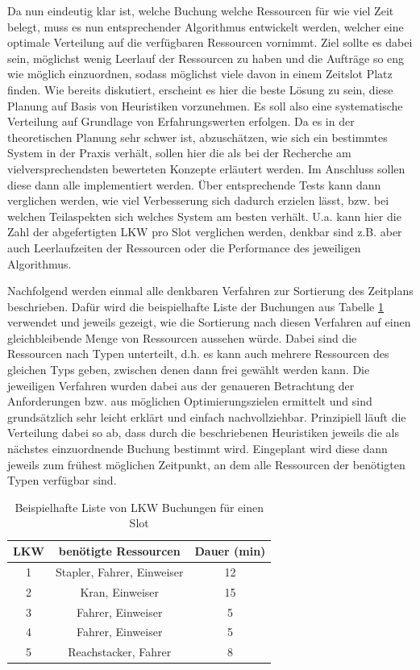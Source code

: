 Da nun eindeutig klar ist, welche Buchung welche Ressourcen für wie viel Zeit belegt, muss es nun entsprechender Algorithmus entwickelt werden, welcher eine optimale Verteilung auf die verfügbaren Ressourcen vornimmt. Ziel sollte es dabei sein, möglichst wenig Leerlauf der Ressourcen zu haben und die Aufträge so eng wie möglich einzuordnen, sodass möglichst viele davon in einem Zeitslot Platz finden. Wie bereits diskutiert, erscheint es hier die beste Lösung zu sein, diese Planung auf Basis von Heuristiken vorzunehmen. Es soll also eine systematische Verteilung auf Grundlage von Erfahrungswerten erfolgen. Da es in der theoretischen Planung sehr schwer ist, abzuschätzen, wie sich ein bestimmtes System in der Praxis verhält, sollen hier die als bei der Recherche am vielversprechendsten bewerteten Konzepte erläutert werden. Im Anschluss sollen diese dann alle implementiert werden. Über entsprechende Tests kann dann verglichen werden, wie viel Verbesserung sich dadurch erzielen lässt, bzw. bei welchen Teilaspekten sich welches System am besten verhält. U.a. kann hier die Zahl der abgefertigten LKW pro Slot verglichen werden, denkbar sind z.B. aber auch Leerlaufzeiten der Ressourcen oder die Performance des jeweiligen Algorithmus.

Nachfolgend werden einmal alle denkbaren Verfahren zur Sortierung des Zeitplans beschrieben. Dafür wird die beispielhafte Liste der Buchungen aus Tabelle \ref{tab:exampleAdvices} verwendet und jeweils gezeigt, wie die Sortierung nach diesen Verfahren auf einen gleichbleibende Menge von Ressourcen aussehen würde. Dabei sind die Ressourcen nach Typen unterteilt, d.h. es kann auch mehrere Ressourcen des gleichen Typs geben, zwischen denen dann frei gewählt werden kann. Die jeweiligen Verfahren wurden dabei aus der genaueren Betrachtung der Anforderungen bzw. aus möglichen Optimierungszielen ermittelt und sind grundsätzlich sehr leicht erklärt und einfach nachvollziehbar. Prinzipiell läuft die Verteilung dabei so ab, dass durch die beschriebenen Heuristiken jeweils die als nächstes einzuordnende Buchung bestimmt wird. Eingeplant wird diese dann jeweils zum frühest möglichen Zeitpunkt, an dem alle Ressourcen der benötigten Typen verfügbar sind.

\begin{table}[!h]
\begin{center}
\caption{Beispielhafte Liste von LKW Buchungen für einen Slot}
\label{tab:exampleAdvices}
\begin{tabular}{c|c|c} 
    LKW & benötigte Ressourcen & Dauer (min) \\\hline
    1 & Stapler, Fahrer, Einweiser & 12 \\\hline
    2 & Kran, Einweiser & 15 \\\hline
    3 & Fahrer, Einweiser & 5 \\\hline
    4 & Fahrer, Einweiser & 5 \\\hline
    5 & Reachstacker, Fahrer & 8 \\
\end{tabular}
\end{center}
\end{table}

